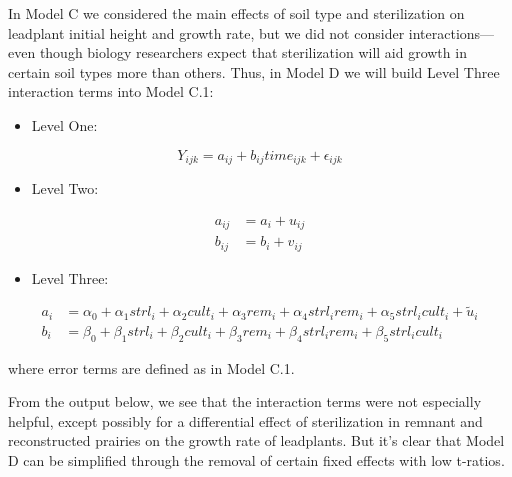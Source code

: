 \documentclass[
]{krantz}
\providecommand{\tightlist}{%
  \setlength{\itemsep}{0pt}\setlength{\parskip}{0pt}}
\begin{document}
In Model C we considered the main effects of soil type and sterilization on leadplant initial height and growth rate, but we did not consider interactions---even though biology researchers expect that sterilization will aid growth in certain soil types more than others. Thus, in Model D we will build Level Three interaction terms into Model C.1:

\begin{itemize}
\tightlist
\item
  Level One:
\end{itemize}

\begin{equation}
Y_{ijk} = a_{ij}+b_{ij}\textstyle{time}_{ijk}+\epsilon_{ijk}
\end{equation}

\begin{itemize}
\tightlist
\item
  Level Two:
\end{itemize}

\begin{align*}
a_{ij} & = a_{i}+u_{ij} \\
b_{ij} & = b_{i}+v_{ij}
\end{align*}

\begin{itemize}
\tightlist
\item
  Level Three:
\end{itemize}

\begin{align*}
a_{i} & = \alpha_{0} + \alpha_{1}\textstyle{strl}_{i} + \alpha_{2}\textstyle{cult}_{i} + \alpha_{3}\textstyle{rem}_{i} + \alpha_{4}\textstyle{strl}_{i}\textstyle{rem}_{i} + \alpha_{5}\textstyle{strl}_{i}\textstyle{cult}_{i} + \tilde{u}_{i} \\
b_{i} & = \beta_{0}+\beta_{1}\textstyle{strl}_{i}+\beta_{2}\textstyle{cult}_{i}+\beta_{3}\textstyle{rem}_{i} + \beta_{4}\textstyle{strl}_{i}\textstyle{rem}_{i} + \beta_{5}\textstyle{strl}_{i}\textstyle{cult}_{i}
\end{align*}

where error terms are defined as in Model C.1.

From the output below, we see that the interaction terms were not especially helpful, except possibly for a differential effect of sterilization in remnant and reconstructed prairies on the growth rate of leadplants. But it's clear that Model D can be simplified through the removal of certain fixed effects with low t-ratios.
\end{document}

